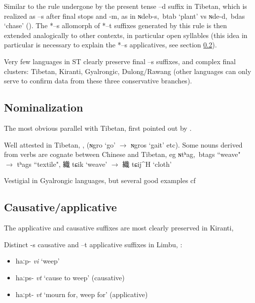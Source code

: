 \documentclass[oldfontcommands,oneside,a4paper,11pt]{article}
\newcommand{\ipa}[1]{{\phon \mbox{#1}}} %
\newcommand{\zh}[1]{{\cn #1}}
\newcommand{\ch}[3]{\zh{#1} \ipa{#2} `#3'}
\begin{document}
Similar to the rule undergone by the present tense \ipa{--d} suffix in Tibetan, which is realized as \ipa{--s} after final stops and \ipa{-m}, as in \ipa{ɴdeb-s, btab}   `plant' vs \ipa{ɴde-d, bdas}   `chase' (\citealt[52-53]{coblin76}). The *\ipa{--s} allomorph of *\ipa{--t} suffixes generated by this rule is then extended analogically to other contexts, in particular open syllables (this idea in particular is necessary to explain the *\ipa{--s} applicatives, see section \ref{sec:causative}).


Very few languages in ST clearly preserve final \ipa{--s} suffixes, and complex final clusters: Tibetan, Kiranti, Gyalrongic, Dulong/Rawang (other languages can only serve to confirm data from these three conservative branches). 

\subsection{Nominalization}
The most obvious parallel with Tibetan, first pointed out by \citet{forrest60occlusives}.

Well attested in Tibetan, \citet[43]{conrady1896}, \citet[624-5]{hill14derivational} (\ipa{ɴgro} `go'  $\rightarrow$ \ipa{ɴgros} `gait' etc). Some nouns derived from verbs are cognate between Chinese and Tibetan, eg \ipa{ɴtʰag, btags} ``weave" $\rightarrow$ \ipa{tʰags} ``textile", \ch{織}{tɕik}{weave} $\rightarrow$ \ch{織}{tɕij^H}{cloth} 

Vestigial in Gyalrongic languages, but several good examples cf \citet{jacques03s.houzhui}

 

\subsection{Causative/applicative} \label{sec:causative}
The applicative and causative suffixes are most clearly preserved in Kiranti, \citet{michailovsky85dental, jacques15derivational.khaling}

Distinct \ipa{-s} causative and \ipa{--t} applicative suffixes in Limbu, \citealt{michailovsky02dico}:
\begin{itemize}
\item \ipa{haːp-} \textit{vi} `weep'
\item \ipa{haːps-} \textit{vt} `cause to weep' (causative)
\item \ipa{haːpt-} \textit{vt} `mourn for, weep for' (applicative)
\end{itemize}
\end{document}
